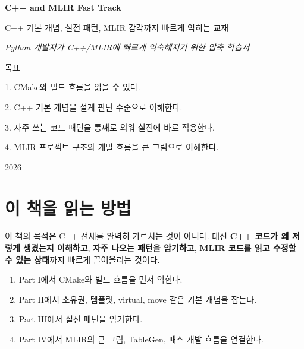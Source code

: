\documentclass[11pt,a4paper]{book}
\newcommand{\term}[1]{\textbf{#1}}
\begin{document}
\begin{titlepage}
\centering
\vspace*{2.0cm}
{\Huge\bfseries C++ and MLIR Fast Track\par}
\vspace{0.6cm}
{\LARGE C++ 기본 개념, 실전 패턴, MLIR 감각까지 빠르게 익히는 교재\par}
\vspace{1.4cm}
{\Large\itshape Python 개발자가 C++/MLIR에 빠르게 익숙해지기 위한 압축 학습서\par}
\vspace{2.2cm}
{\large 목표\par}
\vspace{0.3cm}
{\large 1. CMake와 빌드 흐름을 읽을 수 있다.\par}
{\large 2. C++ 기본 개념을 설계 판단 수준으로 이해한다.\par}
{\large 3. 자주 쓰는 코드 패턴을 통째로 외워 실전에 바로 적용한다.\par}
{\large 4. MLIR 프로젝트 구조와 개발 흐름을 큰 그림으로 이해한다.\par}
\vfill
{\large 2026\par}
\end{titlepage}

\frontmatter
\tableofcontents

\mainmatter

\chapter{이 책을 읽는 방법}

이 책의 목적은 C++ 전체를 완벽히 가르치는 것이 아니다. 대신 \term{C++ 코드가 왜 저렇게 생겼는지 이해하고}, \term{자주 나오는 패턴을 암기하고}, \term{MLIR 코드를 읽고 수정할 수 있는 상태}까지 빠르게 끌어올리는 것이다.

\begin{conceptbox}[title={권장 학습 순서}]
\begin{enumerate}[nosep]
\item Part I에서 CMake와 빌드 흐름을 먼저 익힌다.
\item Part II에서 소유권, 템플릿, virtual, move 같은 기본 개념을 잡는다.
\item Part III에서 실전 패턴을 암기한다.
\item Part IV에서 MLIR의 큰 그림, TableGen, 패스 개발 흐름을 연결한다.
\end{enumerate}
\end{conceptbox}
\end{document}

